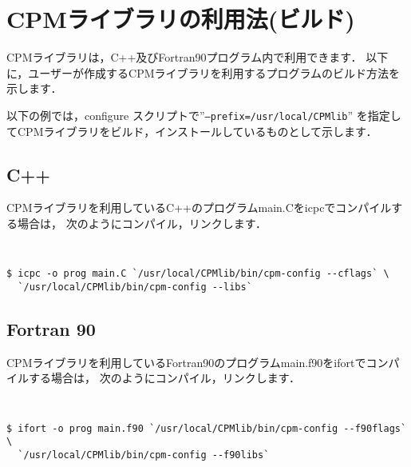 \section{CPMライブラリの利用法(ビルド)}
\label{use_cpmlib}
CPMライブラリは，C++及びFortran90プログラム内で利用できます．
以下に，ユーザーが作成するCPMライブラリを利用するプログラムのビルド方法を示します．

以下の例では，configure スクリプトで''{\tt --prefix=/usr/local/CPMlib}''
を指定してCPMライブラリをビルド，インストールしているものとして示します．

\subsection{C++}
CPMライブラリを利用しているC++のプログラムmain.Cをicpcでコンパイルする場合は，
次のようにコンパイル，リンクします．
{\tt
\begin{verbatim}
$ icpc -o prog main.C `/usr/local/CPMlib/bin/cpm-config --cflags` \
  `/usr/local/CPMlib/bin/cpm-config --libs`
\end{verbatim}
}

\subsection{Fortran 90}
CPMライブラリを利用しているFortran90のプログラムmain.f90をifortでコンパイルする場合は，
次のようにコンパイル，リンクします．
{\tt
\begin{verbatim}
$ ifort -o prog main.f90 `/usr/local/CPMlib/bin/cpm-config --f90flags` \
  `/usr/local/CPMlib/bin/cpm-config --f90libs`
\end{verbatim}
}
